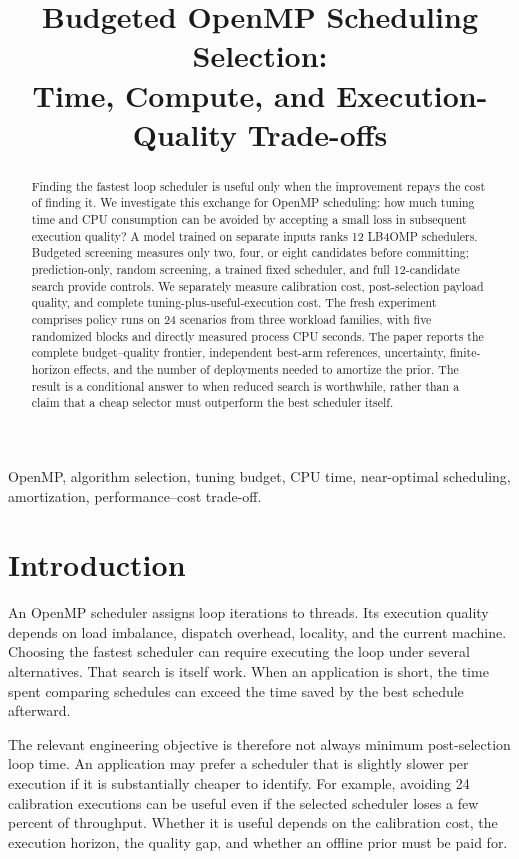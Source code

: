 \documentclass[conference]{IEEEtran}
\title{Budgeted OpenMP Scheduling Selection:\\
Time, Compute, and Execution-Quality Trade-offs}
\author{\IEEEauthorblockN{Shaan Chopra, Mrinal Dhami, and Aniket Verma}
\IEEEauthorblockA{School of Computer Science and Engineering\\
Manipal Institute of Technology\\
Group 3: 240905140, 240905026, 240905156}}
\begin{document}
\maketitle
\thispagestyle{firstpage}
\begin{abstract}
Finding the fastest loop scheduler is useful only when the improvement repays
the cost of finding it. We investigate this exchange for OpenMP scheduling:
how much tuning time and CPU consumption can be avoided by accepting a small
loss in subsequent execution quality? A model trained on separate inputs ranks
12 LB4OMP schedulers. Budgeted screening measures only two, four, or eight
candidates before committing; prediction-only, random screening, a trained
fixed scheduler, and full 12-candidate search provide controls. We separately
measure calibration cost, post-selection payload quality, and complete
tuning-plus-useful-execution cost. The fresh experiment comprises
\OnlineRuns{} policy runs on 24 scenarios from three workload families, with
five randomized blocks and directly measured process CPU seconds.
\AbstractResults{}
The paper reports the complete budget--quality frontier, independent
best-arm references, uncertainty, finite-horizon effects, and the number of
deployments needed to amortize the prior. The result is a conditional answer
to when reduced search is worthwhile, rather than a claim that a cheap
selector must outperform the best scheduler itself.
\end{abstract}
\begin{IEEEkeywords}
OpenMP, algorithm selection, tuning budget, CPU time, near-optimal scheduling,
amortization, performance--cost trade-off.
\end{IEEEkeywords}

\section{Introduction}

An OpenMP scheduler assigns loop iterations to threads. Its execution quality
depends on load imbalance, dispatch overhead, locality, and the current
machine. Choosing the fastest scheduler can require executing the loop under
several alternatives. That search is itself work. When an application is
short, the time spent comparing schedules can exceed the time saved by the
best schedule afterward.

The relevant engineering objective is therefore not always minimum
post-selection loop time. An application may prefer a scheduler that is
slightly slower per execution if it is substantially cheaper to identify.
For example, avoiding 24 calibration executions can be useful even if the
selected scheduler loses a few percent of throughput. Whether it is useful
depends on the calibration cost, the execution horizon, the quality gap, and
whether an offline prior must be paid for.
\end{document}
